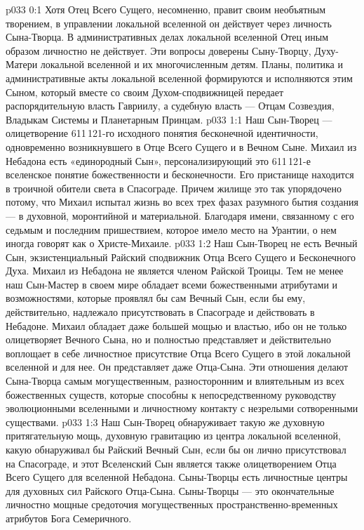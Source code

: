 \author{Глава Архангелов}
\vs p033 0:1 Хотя Отец Всего Сущего, несомненно, правит своим необъятным творением, в управлении локальной вселенной он действует через личность Сына\hyp{}Творца. В административных делах локальной вселенной Отец иным образом личностно не действует. Эти вопросы доверены Сыну\hyp{}Творцу, Духу\hyp{}Матери локальной вселенной и их многочисленным детям. Планы, политика и административные акты локальной вселенной формируются и исполняются этим Сыном, который вместе со своим Духом\hyp{}сподвижницей передает распорядительную власть Гавриилу, а судебную власть --- Отцам Созвездия, Владыкам Системы и Планетарным Принцам.
\vs p033 1:1 Наш Сын\hyp{}Творец --- олицетворение 611\,121\hyp{}го исходного понятия бесконечной идентичности, одновременно возникнувшего в Отце Всего Сущего и в Вечном Сыне. Михаил из Небадона есть «единородный Сын», персонализирующий это 611\,121\hyp{}е вселенское понятие божественности и бесконечности. Его пристанище находится в троичной обители света в Спасограде. Причем жилище это так упорядочено потому, что Михаил испытал жизнь во всех трех фазах разумного бытия создания --- в духовной, моронтийной и материальной. Благодаря имени, связанному с его седьмым и последним пришествием, которое имело место на Урантии, о нем иногда говорят как о Христе\hyp{}Михаиле.
\vs p033 1:2 Наш Сын\hyp{}Творец не есть Вечный Сын, экзистенциальный Райский сподвижник Отца Всего Сущего и Бесконечного Духа. Михаил из Небадона не является членом Райской Троицы. Тем не менее наш Сын\hyp{}Мастер в своем мире обладает всеми божественными атрибутами и возможностями, которые проявлял бы сам Вечный Сын, если бы ему, действительно, надлежало присутствовать в Спасограде и действовать в Небадоне. Михаил обладает даже большей мощью и властью, ибо он не только олицетворяет Вечного Сына, но и полностью представляет и действительно воплощает в себе личностное присутствие Отца Всего Сущего в этой локальной вселенной и для нее. Он представляет даже Отца\hyp{}Сына. Эти отношения делают Сына\hyp{}Творца самым могущественным, разносторонним и влиятельным из всех божественных существ, которые способны к непосредственному руководству эволюционными вселенными и личностному контакту с незрелыми сотворенными существами.
\vs p033 1:3 Наш Сын\hyp{}Творец обнаруживает такую же духовную притягательную мощь, духовную гравитацию из центра локальной вселенной, какую обнаруживал бы Райский Вечный Сын, если бы он лично присутствовал на Спасограде, и  этот Вселенский Сын является также олицетворением Отца Всего Сущего для вселенной Небадона. Сыны\hyp{}Творцы есть личностные центры для духовных сил Райского Отца\hyp{}Сына. Сыны\hyp{}Творцы --- это окончательные личностно мощные средоточия могущественных пространственно\hyp{}временных атрибутов Бога Семеричного.
